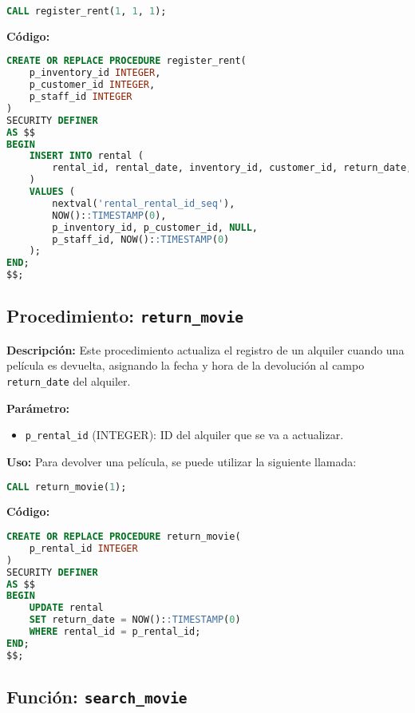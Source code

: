 \documentclass{article}
\begin{document}
\begin{lstlisting}[language=SQL]
CALL register_rent(1, 1, 1);
\end{lstlisting}

\textbf{Código:}
\begin{lstlisting}[language=SQL]
CREATE OR REPLACE PROCEDURE register_rent(
    p_inventory_id INTEGER, 
    p_customer_id INTEGER, 
    p_staff_id INTEGER
)
SECURITY DEFINER
AS $$
BEGIN
    INSERT INTO rental (
        rental_id, rental_date, inventory_id, customer_id, return_date, staff_id, last_update
    )
    VALUES (
        nextval('rental_rental_id_seq'),  
        NOW()::TIMESTAMP(0),  
        p_inventory_id, p_customer_id, NULL,  
        p_staff_id, NOW()::TIMESTAMP(0)
    );
END;
$$;
\end{lstlisting}

\newpage
\subsection{Procedimiento: \texttt{return\_movie}}

\textbf{Descripción:}  
Este procedimiento actualiza el registro de un alquiler cuando una película es devuelta, asignando la fecha y hora de la devolución al campo \texttt{return\_date} del alquiler.

\textbf{Parámetro:}
\begin{itemize}
    \item \texttt{p\_rental\_id} (INTEGER): ID del alquiler que se va a actualizar.
\end{itemize}

\textbf{Uso:}
Para devolver una película, se puede utilizar la siguiente llamada:

\begin{lstlisting}[language=SQL]
CALL return_movie(1);
\end{lstlisting}

\textbf{Código:}
\begin{lstlisting}[language=SQL]
CREATE OR REPLACE PROCEDURE return_movie(
    p_rental_id INTEGER
) 
SECURITY DEFINER
AS $$
BEGIN
    UPDATE rental
    SET return_date = NOW()::TIMESTAMP(0) 
    WHERE rental_id = p_rental_id;
END;
$$;
\end{lstlisting}

\subsection{Función: \texttt{search\_movie}}
\end{document}
